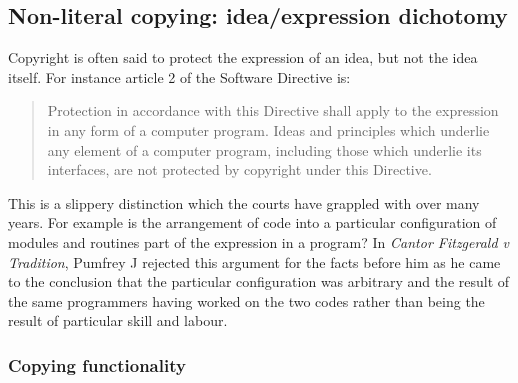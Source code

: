\documentclass[a4paper,12pt]{article}
\newcommand{\SD}[1][]{Software Directive #1\xspace}
\begin{document}
\subsection{Non-literal copying: idea/expression dichotomy}

Copyright is often said to protect the expression of an idea, but not the
idea itself. For instance article 2 of the \SD is:
\begin{quotation}
  Protection in accordance with this Directive shall apply to the expression
  in any form of a computer program. Ideas and principles which underlie any
  element of a computer program, including those which underlie its
  interfaces, are not protected by copyright under this Directive.
\end{quotation}
This is a slippery distinction which the courts have grappled with over many
years. For example is the arrangement of code into a particular
configuration of modules and routines part of the expression in a program? 
In \textit{Cantor Fitzgerald v Tradition}, Pumfrey J rejected this argument
for the facts before him as he came to the conclusion that the particular
configuration was arbitrary and the result of the same programmers having
worked on the two codes rather than being the result of particular skill and
labour. 

\subsubsection{Copying functionality}
\end{document}
